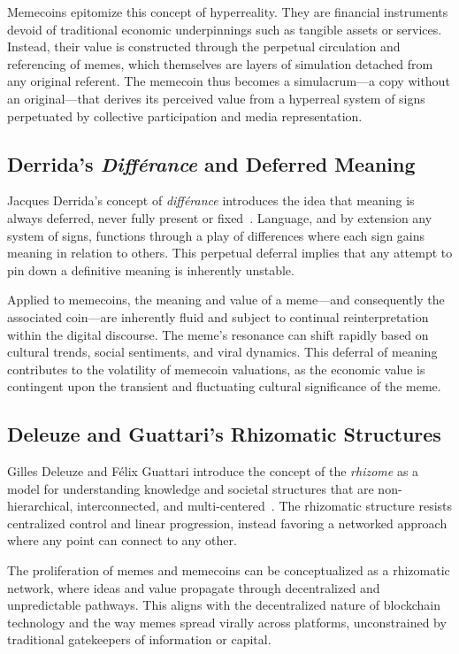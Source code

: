 \documentclass[a4paper,12pt]{article}
\begin{document}
Memecoins epitomize this concept of hyperreality. They are financial instruments devoid of traditional economic underpinnings such as tangible assets or services. Instead, their value is constructed through the perpetual circulation and referencing of memes, which themselves are layers of simulation detached from any original referent. The memecoin thus becomes a simulacrum—a copy without an original—that derives its perceived value from a hyperreal system of signs perpetuated by collective participation and media representation.

\subsection{Derrida's \textit{Différance} and Deferred Meaning}

Jacques Derrida's concept of \textit{différance} introduces the idea that meaning is always deferred, never fully present or fixed~\cite{derrida1976grammatology}. Language, and by extension any system of signs, functions through a play of differences where each sign gains meaning in relation to others. This perpetual deferral implies that any attempt to pin down a definitive meaning is inherently unstable.

Applied to memecoins, the meaning and value of a meme—and consequently the associated coin—are inherently fluid and subject to continual reinterpretation within the digital discourse. The meme's resonance can shift rapidly based on cultural trends, social sentiments, and viral dynamics. This deferral of meaning contributes to the volatility of memecoin valuations, as the economic value is contingent upon the transient and fluctuating cultural significance of the meme.

\subsection{Deleuze and Guattari's Rhizomatic Structures}

Gilles Deleuze and Félix Guattari introduce the concept of the \textit{rhizome} as a model for understanding knowledge and societal structures that are non-hierarchical, interconnected, and multi-centered~\cite{deleuze1987thousand}. The rhizomatic structure resists centralized control and linear progression, instead favoring a networked approach where any point can connect to any other.

The proliferation of memes and memecoins can be conceptualized as a rhizomatic network, where ideas and value propagate through decentralized and unpredictable pathways. This aligns with the decentralized nature of blockchain technology and the way memes spread virally across platforms, unconstrained by traditional gatekeepers of information or capital.
\end{document}

